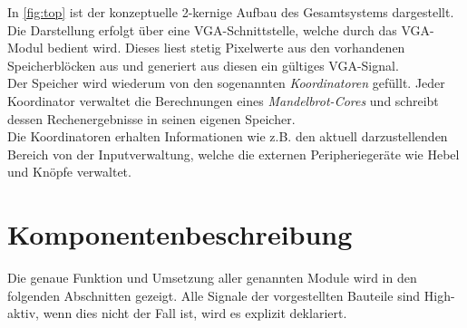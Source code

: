 \documentclass[a4paper,12pt,onesided]{report}
\begin{document}
In \autoref{fig:top} ist der konzeptuelle 2-kernige Aufbau des Gesamtsystems dargestellt.\\
Die Darstellung erfolgt über eine VGA-Schnittstelle, welche durch das VGA-Modul bedient wird.
Dieses liest stetig Pixelwerte aus den vorhandenen Speicherblöcken aus und generiert aus diesen ein gültiges VGA-Signal.\\
Der Speicher wird wiederum von den sogenannten \textit{Koordinatoren} gefüllt.
Jeder Koordinator verwaltet die Berechnungen eines \textit{Mandelbrot-Cores} und schreibt dessen Rechenergebnisse in seinen eigenen Speicher.\\
Die Koordinatoren erhalten Informationen wie z.B. den aktuell darzustellenden Bereich von der Inputverwaltung, welche die externen Peripheriegeräte wie Hebel und Knöpfe verwaltet.\\

\section{Komponentenbeschreibung}
Die genaue Funktion und Umsetzung aller genannten Module wird in den folgenden Abschnitten gezeigt.
Alle Signale der vorgestellten Bauteile sind High-aktiv,
wenn dies nicht der Fall ist, wird es explizit deklariert.
\end{document}

